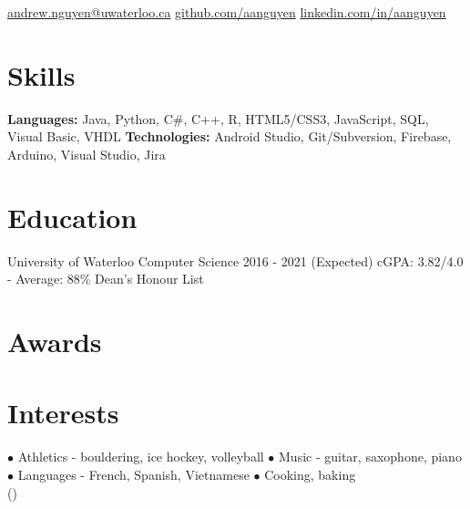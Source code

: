 \documentclass[]{aanguyen_res}
\begin{document}
	\begin{sidebar}%
		\vspace{35pt}%
			\iconentry{\faEnvelope}\href{mailto:andrew.nguyen@uwaterloo.ca}{andrew.nguyen@uwaterloo.ca}
			\iconentry{\faGithub}\href{http://github.com/aanguyen}{github.com/aanguyen}
			\iconentry{\faLinkedin}\href{http://www.linkedin.com/in/aanguyen}{linkedin.com/in/aanguyen}
			\vspace{0.75cm}%
		\section{Skills}
			\textbf{Languages: }Java, Python, C\#, C++, R, HTML5/CSS3, JavaScript, SQL, Visual Basic, VHDL
			\vspace{0.15cm}%
			\textbf{Technologies: }Android Studio, Git/Subversion, Firebase, Arduino, Visual Studio, Jira
			\vspace{1cm}%
		\section{Education}
			\eduentry%
				{University of Waterloo}%
				{Computer Science}%
				{2016 - 2021 (Expected)}%
				{cGPA: 3.82/4.0 - Average: 88\%}%
				{Dean's Honour List}
			\vspace{0.65cm}%
		\section{Awards}
			\vspace{0.65cm}%
		\section{Interests}
		$\bullet$ Athletics - bouldering, ice hockey, volleyball
		$\bullet$ Music - guitar, saxophone, piano
		$\bullet$ Languages - French, Spanish, Vietnamese
		$\bullet$ Cooking, baking\\()
	\end{sidebar}%
\end{document}
